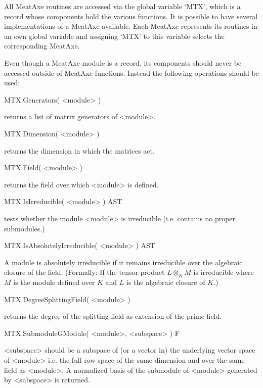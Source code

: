 All MeatAxe routines are accessed via the global variable `MTX', which is a
record whose components hold the various functions. It is possible to have
several implementations of a MeatAxe available. Each MeatAxe represents its
routines in an own global variable and assigning `MTX' to this variable
selects the corresponding MeatAxe.


Even though a MeatAxe module is a record, its components should never be
accessed outside of MeatAxe functions. Instead the following operations
should be used:

\>MTX.Generators( <module> )

returns a list of matrix generators of <module>.

\>MTX.Dimension( <module> )

returns the dimension in which the matrices act.

\>MTX.Field( <module> )

returns the field over which <module> is defined.


\>MTX.IsIrreducible( <module> ) AST

tests whether the module <module> is irreducible (i.e. contains no proper
submodules.)

\>MTX.IsAbsolutelyIrreducible( <module> ) AST

A module is absolutely irreducible if it remains irreducible over the
algebraic closure of the field. (Formally: If the tensor product $L\otimes_K
M$ is irreducible where $M$ is the module defined over $K$ and $L$ is the
algebraic closure of $K$.)

\>MTX.DegreeSplittingField( <module> )

returns the degree of the splitting field as extension of the prime field.


\>MTX.SubmoduleGModule( <module>, <subspace> ) F

<subspace> should be a subspace of (or a vector in) the underlying vector
space of <module> i.e. the full row space of the same dimension and over
the same field as <module>. A normalized basis of the submodule of
<module> generated by <subspace> is returned.

